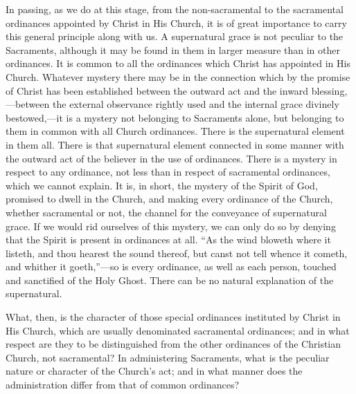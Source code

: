 \documentclass[]{book}
\begin{document}
In passing, as we do at this stage, from the non-sacramental to the sacramental ordinances appointed by Christ in His Church, it is of great importance to carry this general principle along with us. A supernatural grace is not peculiar to the Sacraments, although it may be found in them in larger measure than in other ordinances. It is common to all the ordinances which Christ has appointed in His Church. Whatever mystery there may be in the connection which by the promise of Christ has been established between the outward act and the inward blessing,---between the external observance rightly used and the internal grace divinely bestowed,---it is a mystery not belonging to Sacraments alone, but belonging to them in common with all Church ordinances. There is the supernatural element in them all. There is that supernatural element connected in some manner with the outward act of the believer in the use of ordinances. There is a mystery in respect to any ordinance, not less than in respect of sacramental ordinances, which we cannot explain. It is, in short, the mystery of the Spirit of God, promised to dwell in the Church, and making every ordinance of the Church, whether sacramental or not, the channel for the conveyance of supernatural grace. If we would rid ourselves of this mystery, we can only do so by denying that the Spirit is present in ordinances at all. ``As the wind bloweth where it listeth, and thou hearest the sound thereof, but canst not tell whence it cometh, and whither it goeth,''---so is every ordinance, as well as each person, touched and sanctified of the Holy Ghost. There can be no natural explanation of the supernatural.

What, then, is the character of those special ordinances instituted by Christ in His Church, which are usually denominated sacramental ordinances; and in what respect are they to be distinguished from the other ordinances of the Christian Church, not sacramental? In administering Sacraments, what is the peculiar nature or character of the Church's act; and in what manner does the administration differ from that of common ordinances?
\end{document}
